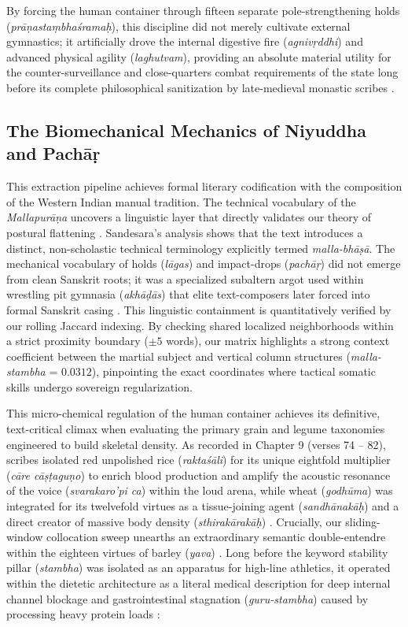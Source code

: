 \documentclass[11pt,twoside,letterpaper]{article}
\begin{document}
By forcing the human container through fifteen separate pole-strengthening holds (\textit{prāṇastaṃbhaśramaḥ}), this discipline did not merely cultivate external gymnastics; it artificially drove the internal digestive fire (\textit{agnivṛddhi}) and advanced physical agility (\textit{laghutvam}), providing an absolute material utility for the counter-surveillance and close-quarters combat requirements of the state long before its complete philosophical sanitization by late-medieval monastic scribes \citep{MP_7, Thomas2025}.


\subsection{The Biomechanical Mechanics of Niyuddha and Pachāṛ}
This extraction pipeline achieves formal literary codification with the composition of the Western Indian manual tradition. The technical vocabulary of the \textit{Mallapurāṇa} uncovers a linguistic layer that directly validates our theory of postural flattening \citep{MP_7}. Sandesara’s analysis shows that the text introduces a distinct, non-scholastic technical terminology explicitly termed \textit{malla-bhāṣā}. The mechanical vocabulary of holds (\textit{lāgas}) and impact-drops (\textit{pachāṛ}) did not emerge from clean Sanskrit roots; it was a specialized subaltern argot used within wrestling pit gymnasia (\textit{akhāḍās}) that elite text-composers later forced into formal Sanskrit casing \citep{Sandesara1948}. This linguistic containment is quantitatively verified by our rolling Jaccard indexing. By checking shared localized neighborhoods within a strict proximity boundary ($\pm 5$ words), our matrix highlights a strong context coefficient between the martial subject and vertical column structures (\textit{malla-stambha} = $0.0312$), pinpointing the exact coordinates where tactical somatic skills undergo sovereign regularization.

This micro-chemical regulation of the human container achieves its definitive, text-critical climax when evaluating the primary grain and legume taxonomies engineered to build skeletal density. As recorded in Chapter 9 (verses 74 -- 82), scribes isolated red unpolished rice (\textit{raktaśāli}) for its unique eightfold multiplier (\textit{cāre cāṣṭaguṇo}) to enrich blood production and amplify the acoustic resonance of the voice (\textit{svarakaro'pi ca}) within the loud arena, while wheat (\textit{godhūma}) was integrated for its twelvefold virtues as a tissue-joining agent (\textit{sandhānakāḥ}) and a direct creator of massive body density (\textit{sthirakārakāḥ}) \citep{MP_7}. Crucially, our sliding-window collocation sweep unearths an extraordinary semantic double-entendre within the eighteen virtues of barley (\textit{yava}) \citep{MP_7}. Long before the keyword stability pillar (\textit{stambha}) was isolated as an apparatus for high-line athletics, it operated within the dietetic architecture as a literal medical description for deep internal channel blockage and gastrointestinal stagnation (\textit{guru-stambha}) caused by processing heavy protein loads \citep{MP_7}:
\end{document}
